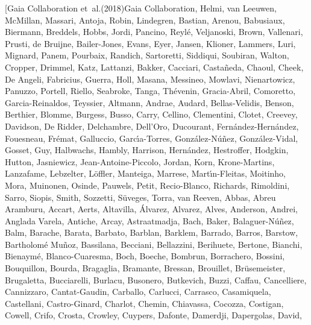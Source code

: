 \documentclass[longauth]{aa} %
\begin{document}
\begin{thebibliography}{112}
	\bibitem[{{Gaia Collaboration} {et~al.}(2018{}){Gaia
			Collaboration}, {Helmi}, {van Leeuwen}, {McMillan}, {Massari}, {Antoja},
		{Robin}, {Lindegren}, {Bastian}, {Arenou}, {Babusiaux}, {Biermann},
		{Breddels}, {Hobbs}, {Jordi}, {Pancino}, {Reyl{\'e}}, {Veljanoski}, {Brown},
		{Vallenari}, {Prusti}, {de Bruijne}, {Bailer-Jones}, {Evans}, {Eyer},
		{Jansen}, {Klioner}, {Lammers}, {Luri}, {Mignard}, {Panem}, {Pourbaix},
		{Randich}, {Sartoretti}, {Siddiqui}, {Soubiran}, {Walton}, {Cropper},
		{Drimmel}, {Katz}, {Lattanzi}, {Bakker}, {Cacciari}, {Casta{\~n}eda},
		{Chaoul}, {Cheek}, {De Angeli}, {Fabricius}, {Guerra}, {Holl}, {Masana},
		{Messineo}, {Mowlavi}, {Nienartowicz}, {Panuzzo}, {Portell}, {Riello},
		{Seabroke}, {Tanga}, {Th{\'e}venin}, {Gracia-Abril}, {Comoretto},
		{Garcia-Reinaldos}, {Teyssier}, {Altmann}, {Andrae}, {Audard},
		{Bellas-Velidis}, {Benson}, {Berthier}, {Blomme}, {Burgess}, {Busso},
		{Carry}, {Cellino}, {Clementini}, {Clotet}, {Creevey}, {Davidson}, {De
			Ridder}, {Delchambre}, {Dell'Oro}, {Ducourant},
		{Fern{\'a}ndez-Hern{\'a}ndez}, {Fouesneau}, {Fr{\'e}mat}, {Galluccio},
		{Garc{\'\i}a-Torres}, {Gonz{\'a}lez-N{\'u}{\~n}ez}, {Gonz{\'a}lez-Vidal},
		{Gosset}, {Guy}, {Halbwachs}, {Hambly}, {Harrison}, {Hern{\'a}ndez},
		{Hestroffer}, {Hodgkin}, {Hutton}, {Jasniewicz}, {Jean-Antoine-Piccolo},
		{Jordan}, {Korn}, {Krone-Martins}, {Lanzafame}, {Lebzelter}, {L{\"o}ffler},
		{Manteiga}, {Marrese}, {Mart{\'\i}n-Fleitas}, {Moitinho}, {Mora}, {Muinonen},
		{Osinde}, {Pauwels}, {Petit}, {Recio-Blanco}, {Richards}, {Rimoldini},
		{Sarro}, {Siopis}, {Smith}, {Sozzetti}, {S{\"u}veges}, {Torra}, {van Reeven},
		{Abbas}, {Abreu Aramburu}, {Accart}, {Aerts}, {Altavilla}, {{\'A}lvarez},
		{Alvarez}, {Alves}, {Anderson}, {Andrei}, {Anglada Varela}, {Antiche},
		{Arcay}, {Astraatmadja}, {Bach}, {Baker}, {Balaguer-N{\'u}{\~n}ez}, {Balm},
		{Barache}, {Barata}, {Barbato}, {Barblan}, {Barklem}, {Barrado}, {Barros},
		{Barstow}, {Bartholom{\'e} Mu{\~n}oz}, {Bassilana}, {Becciani}, {Bellazzini},
		{Berihuete}, {Bertone}, {Bianchi}, {Bienaym{\'e}}, {Blanco-Cuaresma}, {Boch},
		{Boeche}, {Bombrun}, {Borrachero}, {Bossini}, {Bouquillon}, {Bourda},
		{Bragaglia}, {Bramante}, {Bressan}, {Brouillet}, {Br{\"u}semeister},
		{Brugaletta}, {Bucciarelli}, {Burlacu}, {Busonero}, {Butkevich}, {Buzzi},
		{Caffau}, {Cancelliere}, {Cannizzaro}, {Cantat-Gaudin}, {Carballo},
		{Carlucci}, {Carrasco}, {Casamiquela}, {Castellani}, {Castro-Ginard},
		{Charlot}, {Chemin}, {Chiavassa}, {Cocozza}, {Costigan}, {Cowell}, {Crifo},
		{Crosta}, {Crowley}, {Cuypers}, {Dafonte}, {Damerdji}, {Dapergolas}, {David},
}
\end{thebibliography}
\end{document}
